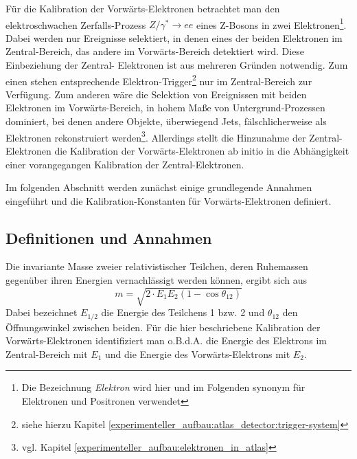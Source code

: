 Für die Kalibration der Vorwärts-Elektronen betrachtet man den elektroschwachen
Zerfalls-Prozess $Z/\gamma^* \rightarrow ee$ eines Z-Bosons in zwei
Elektronen\footnote{Die Bezeichnung \textit{Elektron} wird hier und im
Folgenden synonym für Elektronen und Positronen verwendet}. Dabei werden nur
Ereignisse selektiert, in denen eines der beiden Elektronen im Zentral-Bereich,
das andere im Vorwärts-Bereich detektiert wird. Diese Einbeziehung der Zentral-
Elektronen ist aus mehreren Gründen notwendig. Zum einen stehen entsprechende
Elektron-Trigger\footnote{siehe hierzu Kapitel
\ref{experimenteller_aufbau:atlas_detector:trigger-system}}
nur im Zentral-Bereich zur Verfügung. Zum anderen wäre die Selektion von
Ereignissen mit beiden Elektronen im Vorwärts-Bereich, in hohem Maße von
Untergrund-Prozessen dominiert, bei denen andere Objekte, überwiegend Jets,
fälschlicherweise als Elektronen rekonstruiert werden\footnote{vgl. Kapitel
\ref{experimenteller_aufbau:elektronen_in_atlas}}.
Allerdings stellt die Hinzunahme der Zentral-Elektronen die Kalibration der
Vorwärts-Elektronen ab initio in die Abhängigkeit einer vorangegangen 
Kalibration der Zentral-Elektronen.

Im folgenden Abschnitt werden zunächst einige grundlegende Annahmen eingeführt
und die Kalibration-Konstanten für Vorwärts-Elektronen definiert.



\subsection{Definitionen und Annahmen}
\label{energy_calibration:definitionen_und_annahmen}

Die invariante Masse zweier relativistischer Teilchen, deren Ruhemassen
gegenüber ihren Energien vernachlässigt werden können, ergibt sich aus
\begin{equation}
    \label{invariant_mass:basic}
    m = \sqrt{ 2 \cdot E_1 E_2 (1-\cos\theta_{12}) }
\end{equation}
Dabei bezeichnet $E_{1/2}$ die Energie des Teilchens 1 bzw. 2 und $\theta_{12}$
den Öffnungswinkel zwischen beiden. Für die hier beschriebene Kalibration der
Vorwärts-Elektronen identifiziert man o.B.d.A. die Energie des Elektrons im
Zentral-Bereich mit $E_1$ und die Energie des Vorwärts-Elektrons mit $E_2$.

